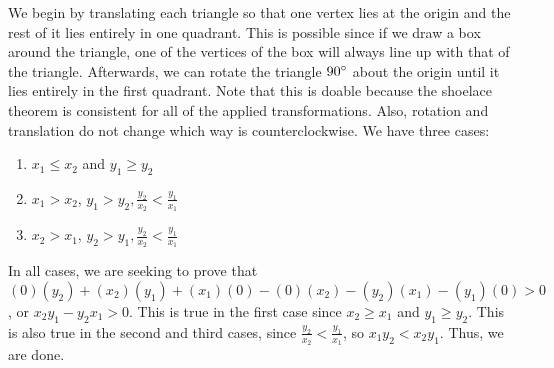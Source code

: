 \documentclass[11pt]{article}
\begin{document}
\begin{solution}
We begin by translating each triangle so that one vertex lies at the origin and the rest of it lies entirely in one quadrant. This is possible since if we draw a box around the triangle, one of the vertices of the box will always line up with that of the triangle. Afterwards, we can rotate the triangle $90 \degree$ about the origin until it lies entirely in the first quadrant. Note that this is doable because the shoelace theorem is consistent for all of the applied transformations. Also, rotation and translation do not change which way is counterclockwise. We have three cases:
\phantom{blahbity blah} 
\begin{multicols}{3}
\begin{enumerate}
\item $x_1 \leq x_2$ and $y_1 \geq y_2$
    \newline
\item $x_1 > x_2$, $y_1 > y_2, \frac{y_2}{x_2} < \frac{y_1}{x_1}$
    \newline
\item $x_2 > x_1$, $y_2 > y_1, \frac{y_2}{x_2} < \frac{y_1}{x_1}$
    \newline
\end{enumerate}

\end{multicols}
In all cases, we are seeking to prove that $(0)(y_2) + (x_2)(y_1) + (x_1)(0) - (0)(x_2) - (y_2)(x_1) - (y_1)(0) > 0$, or $x_2y_1-y_2x_1 > 0$. This is true in the first case since  $x_2 \geq x_1$ and $y_1 \geq y_2$. This is also true in the second and third cases, since $\frac{y_2}{x_2} < \frac{y_1}{x_1}$, so $x_1y_2 < x_2y_1$. Thus, we are done.

\end{solution}
\end{document}
